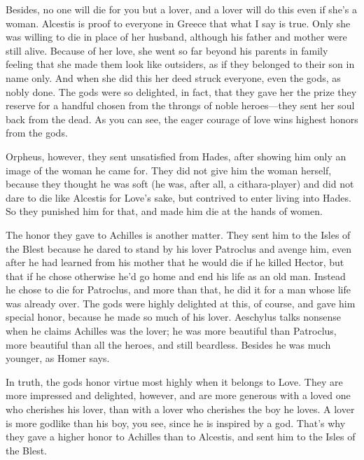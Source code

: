 Besides, no one will die for you but a lover, and a lover will do this
even if she’s a woman. Alcestis is proof to everyone in Greece that what
 I say is
true. Only she was
willing to die in place of her husband, although his father and mother
were still alive. Because of her love, she went so far beyond his
parents in family feeling that she made them look like outsiders, as if
they belonged to their son in name only. And when she did this her deed
struck everyone, even the gods, as nobly done. The gods were so
delighted, in fact, that they gave her the prize they reserve for a
handful  chosen from the throngs of noble heroes---they sent her
soul back from the dead. As you can see, the eager courage of love wins
highest honors from the gods.

Orpheus, however, they sent unsatisfied from Hades, after showing him
only an image of the woman he came for. They did not give him the woman
herself, because they thought he was soft (he was, after all, a
cithara-player) and did not dare to die like Alcestis for Love’s sake,
but contrived to enter living into Hades. So they punished him for that,
and  made him die at the hands of
women.

The honor they gave to Achilles is another matter. They sent him to the
Isles of the Blest because he dared to stand by his lover Patroclus and
 avenge him, even after he had learned from his mother
that he would die if he killed Hector, but that if he chose otherwise
he’d go home and end his life as an old man. Instead he chose to die for
Patroclus, and more than that, he did it for a man whose life was
already over. The gods were highly delighted at this, of course, and
gave him special honor, because he made so much of his lover. Aeschylus
talks nonsense when he claims Achilles was the
lover; he was more
beautiful than Patroclus, more beautiful than all the heroes, and still
beardless. Besides he was much younger, as Homer says.

In truth, the gods honor virtue most highly when it belongs to Love.
 They are more impressed and delighted, however, and are more
generous with a loved one who cherishes his lover, than with a lover who
cherishes the boy he loves. A lover is more godlike than his boy, you
see, since he is inspired by a god. That’s why they gave a higher honor
to Achilles than to Alcestis, and sent him to the Isles of the Blest.

